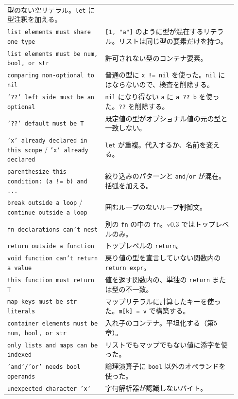 \begin{longtable}{@{}p{0.40\linewidth}p{0.54\linewidth}@{}}
型のない空リテラル。\texttt{let} に型注釈を加える。 \\
\addlinespace
\texttt{list elements must share one type} &
\texttt{[1, "a"]} のように型が混在するリテラル。リストは同じ型の要素だけを持つ。 \\
\addlinespace
\texttt{list elements must be num, bool, or str} &
許可されない型のコンテナ要素。 \\
\addlinespace
\texttt{comparing non-optional to nil} &
普通の型に \texttt{x != nil} を使った。\texttt{nil} にはならないので、検査を削除する。 \\
\addlinespace
\texttt{'??' left side must be an optional} &
\texttt{nil} になり得ない \texttt{a} に \texttt{a ?? b} を使った。\texttt{??} を削除する。 \\
\addlinespace
\texttt{'??' default must be T} &
既定値の型がオプショナル値の元の型と一致しない。 \\
\addlinespace
\texttt{'x' already declared in this scope} / \texttt{'x' already declared} &
\texttt{let} が重複。代入するか、名前を変える。 \\
\addlinespace
\texttt{parenthesize this condition: (a != b) and ...} &
絞り込みのパターンと \texttt{and}/\texttt{or} が混在。括弧を加える。 \\
\addlinespace
\texttt{break outside a loop} / \texttt{continue outside a loop} &
囲むループのないループ制御文。 \\
\addlinespace
\texttt{fn declarations can't nest} &
別の \texttt{fn} の中の \texttt{fn}。v0.3 ではトップレベルのみ。 \\
\addlinespace
\texttt{return outside a function} &
トップレベルの \texttt{return}。 \\
\addlinespace
\texttt{void function can't return a value} &
戻り値の型を宣言していない関数内の \texttt{return expr}。 \\
\addlinespace
\texttt{this function must return T} &
値を返す関数内の、単独の \texttt{return} または型の不一致。 \\
\addlinespace
\texttt{map keys must be str literals} &
マップリテラルに計算したキーを使った。\texttt{m[k] = v} で構築する。 \\
\addlinespace
\texttt{container elements must be num, bool, or str} &
入れ子のコンテナ。平坦化する（第5章）。 \\
\addlinespace
\texttt{only lists and maps can be indexed} &
リストでもマップでもない値に添字を使った。 \\
\addlinespace
\texttt{'and'/'or' needs bool operands} &
論理演算子に \texttt{bool} 以外のオペランドを使った。 \\
\addlinespace
\texttt{unexpected character 'x'} &
字句解析器が認識しないバイト。 \\
\end{longtable}
\endgroup

